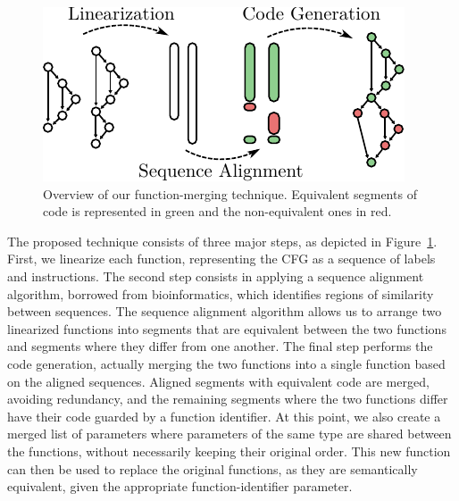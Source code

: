 \begin{figure}[t!]
  \centering
  \includegraphics[width=0.85\linewidth]{figs/func-merge-overview.pdf}
  \caption{Overview of our function-merging technique.
           Equivalent segments of code is represented in green and the non-equivalent ones in red.
           }


  \label{fig:func-merge-overview}
\end{figure}

The proposed technique consists of three major steps, as depicted in
Figure~\ref{fig:func-merge-overview}.
First, we linearize each function, representing the CFG as a sequence of
labels and instructions.
The second step consists in applying a sequence alignment algorithm, borrowed
from bioinformatics, which identifies regions of similarity between sequences.
The sequence alignment algorithm allows us to arrange two linearized functions
into segments that are equivalent between the two functions and segments where
they differ from one another.
The final step performs the code generation, actually merging the two functions
into a single function based on the aligned sequences.
Aligned segments with equivalent code are merged, avoiding redundancy, %
and the remaining segments where the two functions differ have their code guarded by a function identifier. At this point, we also create a
merged list of parameters where parameters of the same type are shared between the functions, without necessarily keeping their original
order. This new function can then be used to replace the original functions, as they are semantically equivalent, given the appropriate
function-identifier parameter.

